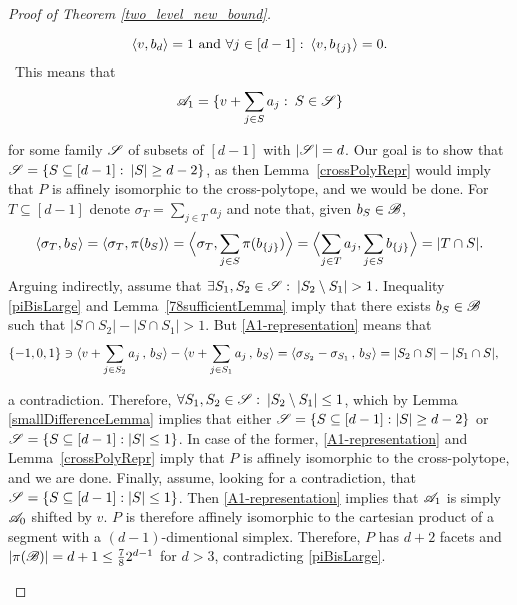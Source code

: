 \begin{proof}[Proof of Theorem \ref{two_level_new_bound}]
\begin{enumerate}
        \[
            \langle v, b_d\rangle = 1\text{ and }\forall j \in [d-1]:\:\langle v, b_{\{j\}}\rangle = 0.
        \]\
        This means that 
        \begin{equation}\label{A1-representation}
            {\mathscr{A}}_1 = \{v+\sum_{j \in S}a_j:\:S\in {\mathscr{S}}\}
        \end{equation}
    
        for some family ${\mathscr{S}}$ of subsets of $[d-1]$ with $|{\mathscr{S}}| = d$. Our goal is to show that ${{\mathscr{S}}= \{S\subseteq[d-1]:\:|S|\geq d-2\}}$, as then Lemma~\ref{crossPolyRepr} would imply that $P$ is affinely  isomorphic to the cross-polytope, and we would be done. For $T \subseteq [d-1]$ denote $\sigma_T=\sum_{j\in T} a_j$ and note that, given $b_S\in {\mathscr{B}}$,
        \[
            \langle \sigma_T, b_S \rangle = \langle \sigma_T, \pi(b_S) \rangle = \Bigl< \sigma_T, \sum_{j\in S}\pi(b_{\{j\}}) \Bigr> = \Bigl< \sum_{j\in T} a_j, \sum_{j\in S}b_{\{j\}} \Bigr> = |T \cap S|.
        \]
        Arguing indirectly, assume that $\exists S_1, S_2 \in {\mathscr{S}}:\:|S_2\setminus S_1| > 1$. Inequality \eqref{piBisLarge} and Lemma~\ref{78sufficientLemma} imply that there exists $b_S\in {\mathscr{B}}$ such that $|S \cap S_2| - |S \cap S_1| > 1$. But \eqref{A1-representation}
        means that
        \begin{align*}
            \{-1,0,1\} & \ni \langle v+\sum_{j \in S_2}  a_j\,,\,b_{S}\rangle - \langle v+\sum_{j \in S_1} a_j\,,\, b_{S} \rangle = \langle \sigma_{S_2} - \sigma_{S_1}\,,\, b_{S} \rangle 
            = |S_2 \cap S| - |S_1 \cap S|,
        \end{align*}
         
        a contradiction. Therefore, $\forall S_1, S_2 \in {\mathscr{S}}:\:|S_2\setminus S_1| \leq 1$, which by Lemma \ref{smallDifferenceLemma} implies that either ${\mathscr{S}} = \{S\subseteq[d-1]: |S| \geq d-2\}$ or ${\mathscr{S}} = \{S\subseteq[d-1]: |S| \leq 1\}$. In case of the former, \eqref{A1-representation} and Lemma~\ref{crossPolyRepr} imply that $P$ is affinely isomorphic to the cross-polytope, and we are done. Finally, assume, looking for a contradiction, that ${\mathscr{S}} = \{S\subseteq[d-1]: |S| \leq 1\}$. Then \eqref{A1-representation} implies that ${\mathscr{A}}_1$ is simply ${\mathscr{A}}_0$ shifted by $v$. $P$ is therefore affinely isomorphic to the cartesian product of a segment with a \mbox{$(d-1)$-dimentional} simplex. Therefore, $P$ has $d+2$ facets and $|\pi({\mathscr{B}})| = d+1 \leq \frac{7}{8} 2^{d-1}$ for $d>3$, contradicting \eqref{piBisLarge}.
    \end{enumerate}
\end{proof}


